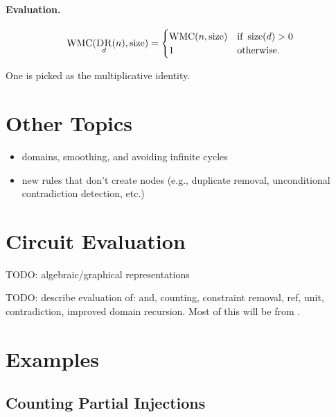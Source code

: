 \documentclass{article}
\theoremstyle{definition}
\DeclareMathOperator{\DR}{\textsc{DR}}
\DeclareMathOperator{\size}{size}
\DeclareMathOperator{\WMC}{WMC}
\begin{document}
\paragraph{Evaluation.}
\[
\WMC(\DR_d(n), \size) =
\begin{cases}
  \WMC(n, \size) & \text{if } \size(d) > 0 \\
  1 & \text{otherwise.}
\end{cases}
\]

One is picked as the multiplicative identity.

\section{Other Topics}

\begin{itemize}
\item domains, smoothing, and avoiding infinite cycles
\item new rules that don't create nodes (e.g., duplicate removal, unconditional contradiction detection, etc.)
\end{itemize}

\section{Circuit Evaluation}

TODO: algebraic/graphical representations

TODO: describe evaluation of: and, counting, constraint removal, ref, unit, contradiction, improved domain recursion. Most of this will be from \cite{DBLP:conf/ijcai/BroeckTMDR11}.

\section{Examples}

\subsection{Counting Partial Injections}



\end{document}
